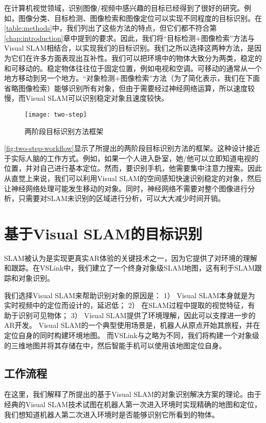 在计算机视觉领域，识别图像/视频中感兴趣的目标已经得到了很好的研究。例如，图像分类\cite{he2019bag}、目标检测\cite{zou2019object}、图像检索\cite{philbin2008lost,zheng2017sift}和图像定位\cite{sattler2011fast}可以实现不同程度的目标识别。在\autoref{table:methods}中，我们列出了这些方法的特点，但它们都不符合第\ref{chap:introduction}章中提到的要求。因此，我们将“目标检测+图像检索”方法与Visual SLAM相结合，以实现我们的目标识别。我们之所以选择这两种方法，是因为它们在许多方面表现出互补性。我们可以把环境中的物体大致分为两类，稳定的和可移动的。稳定物体往往位于固定位置，例如电视和空调。可移动的通常从一个地方移动到另一个地方。“对象检测+图像检索”方法（为了简化表示，我们在下面省略图像检索）能够识别所有对象，但由于需要经过神经网络运算，所以速度较慢，而Visual SLAM可以识别稳定对象且速度较快。

\begin{figure}[htb]
  \centering
  \texttt{[image: two-step]}
  \caption{两阶段目标识别方法框架}
  \label{fig:two-step-workflow}
\end{figure}

\autoref{fig:two-step-workflow}显示了所提出的两阶段目标识别方法的框架。这种设计接近于实际人脑的工作方式。例如，如果一个人进入卧室，她/他可以立即知道电视的位置，并对自己进行基本定位。然而，要识别手机，他需要集中注意力搜索。因此从直觉上来说，我们可以利用Visual SLAM的空间感知快速识别稳定的对象，然后让神经网络处理可能发生移动的对象。同时，神经网络不需要对整个图像进行分析，只需要对SLAM未识别的区域进行分析，可以大大减少时间开销。




   
\section{基于Visual SLAM的目标识别}
\label{sec:vslam}
SLAM被认为是实现更真实AR体验的关键技术之一，因为它提供了对环境的理解和跟踪。在VSLink中，我们建立了一个终身对象级SLAM地图，这有利于SLAM跟踪和对象识别。

我们选择Visual SLAM来帮助识别对象的原因是：
1） Visual SLAM本身就是为实时视频中的定位而设计的，延迟低；
2） 在SLAM过程中提取的视觉特征，有助于识别可见物体；
3） Visual SLAM提供了环境理解，因此可以支撑进一步的AR开发。
Visual SLAM的一个典型使用场景是，机器人从原点开始其旅程，并在定位自身的同时构建环境地图。
而VSLink与之略为不同，我们将构建一个对象级的三维地图并将其存储在{\edg}中，然后智能手机可以使用该地图定位自身。

\subsection{工作流程}
在这里，我们解释了所提出的基于Visual SLAM的对象识别解决方案的理论。由于经典的Visual SLAM\cite{mur2017orb,engel2014lsd}技术试图在机器人第一次进入环境时实现精确的地图和定位，我们想知道机器人第二次进入环境时是否能够识别它所看到的物体。

